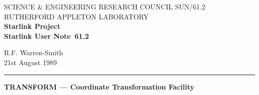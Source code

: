 \pagestyle{myheadings}

\newcommand{\stardoccategory}  {Starlink User Note}
\newcommand{\stardocinitials}  {SUN}
\newcommand{\stardocnumber}    {61.2}
\newcommand{\stardocauthors}   {R.F. Warren-Smith}
\newcommand{\stardocdate}      {21st August 1989}
\newcommand{\stardoctitle}     {TRANSFORM --- Coordinate Transformation 
                                Facility}

\newcommand{\stardocname}{\stardocinitials /\stardocnumber}
\markright{\stardocname}
\setlength{\textwidth}{160mm}
\setlength{\textheight}{240mm}
\setlength{\topmargin}{-5mm}
\setlength{\oddsidemargin}{0mm}
\setlength{\evensidemargin}{0mm}
\setlength{\parindent}{0mm}
\setlength{\parskip}{\medskipamount}
\setlength{\unitlength}{1mm}


\newcommand{\name}[1]{\mbox{#1}}
\newcommand{\fortvar}[1]{\mbox{\em #1}}
\newcommand{\numcir}[1]{\mbox{\hspace{3ex}$\bigcirc$\hspace{-1.7ex}{\small #1}}}
\renewcommand{\_}{{\tt\char'137}}

\newcommand{\example}[1]{\addtocounter{examplecounter}{1}
                         \paragraph{\bf Example \theexamplecounter. #1}}
\newcommand{\exampledone}[0]{\begin{center} \rule{6em}{0.2mm} \end{center}}

\newcommand{\pdiff}[2]{\frac{\partial y_{#1}}{\partial x_{#2}}}
\newcommand{\req}[0]{$\bullet$}
\newcommand{\imp}[0]{$\circ$}
\newcommand{\pro}[0]{$\times$}
\newcommand{\irr}[0]{$-$}



\thispagestyle{empty}
SCIENCE \& ENGINEERING RESEARCH COUNCIL \hfill \stardocname\\
RUTHERFORD APPLETON LABORATORY\\
{\large\bf Starlink Project\\}
{\large\bf \stardoccategory\ \stardocnumber}
\begin{flushright}
\stardocauthors\\
\stardocdate
\end{flushright}
\vspace{-4mm}
\rule{\textwidth}{0.5mm}
\vspace{5mm}
\begin{center}
{\Large\bf \stardoctitle}
\end{center}
\vspace{5mm}

